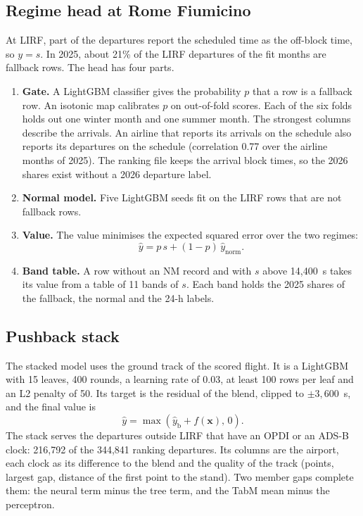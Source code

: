 \documentclass[
  manuscript=article,
  layout=preprint,
  year=2026,
  volume=x,
]{extra/joas}
\begin{document}
\subsection{Regime head at Rome Fiumicino}
\label{sec:lirf}

At LIRF, part of the departures report the scheduled time as the off-block time, so $y = s$. In 2025, about 21\% of the LIRF departures of the fit months are fallback rows. The head has four parts.
\begin{enumerate}
  \item \textbf{Gate.} A LightGBM classifier gives the probability $p$ that a row is a fallback row. An isotonic map \cite{zadrozny2002transforming} calibrates $p$ on out-of-fold scores. Each of the six folds holds out one winter month and one summer month. The strongest columns describe the arrivals. An airline that reports its arrivals on the schedule also reports its departures on the schedule (correlation 0.77 over the airline months of 2025). The ranking file keeps the arrival block times, so the 2026 shares exist without a 2026 departure label.
  \item \textbf{Normal model.} Five LightGBM seeds fit on the LIRF rows that are not fallback rows.
  \item \textbf{Value.} The value minimises the expected squared error over the two regimes:
  \begin{equation}
  \label{eq:lirf}
  \hat{y} = p\, s + (1 - p)\, \hat{y}_{\mathrm{norm}}.
  \end{equation}
  \item \textbf{Band table.} A row without an NM record and with $s$ above 14,400~s takes its value from a table of 11 bands of $s$. Each band holds the 2025 shares of the fallback, the normal and the 24-h labels.
\end{enumerate}

\subsection{Pushback stack}

The stacked model \cite{wolpert1992stacked} uses the ground track of the scored flight. It is a LightGBM with 15 leaves, 400 rounds, a learning rate of 0.03, at least 100 rows per leaf and an L2 penalty of 50. Its target is the residual of the blend, clipped to $\pm 3{,}600$~s, and the final value is
\begin{equation}
\label{eq:stack}
\hat{y} = \max\!\left(\hat{y}_{\mathrm{b}} + f(\mathbf{x}),\, 0\right).
\end{equation}
The stack serves the departures outside LIRF that have an OPDI or an ADS-B clock: 216,792 of the 344,841 ranking departures. Its columns are the airport, each clock as its difference to the blend and the quality of the track (points, largest gap, distance of the first point to the stand). Two member gaps complete them: the neural term minus the tree term, and the TabM mean minus the perceptron.
\end{document}
